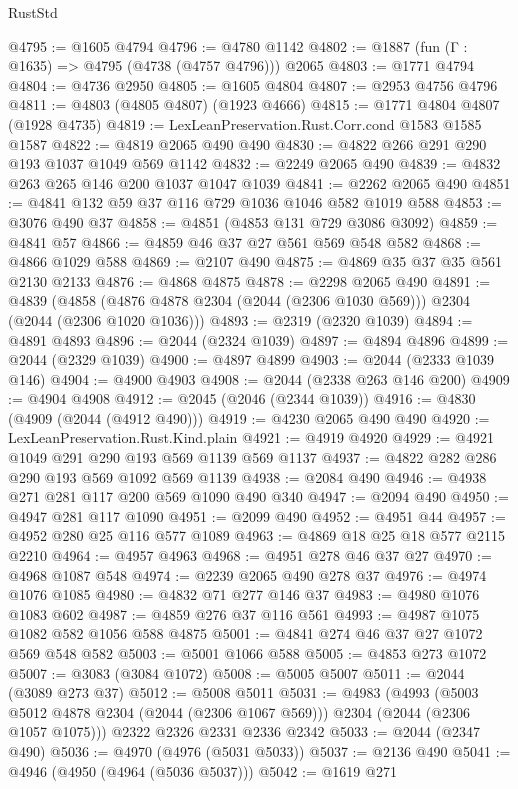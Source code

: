 \begin{lexlean}{RustStd}
\begin{coremodule}
@4795 := @1605 @4794
@4796 := @4780 @1142
@4802 := @1887 (fun (Γ : @1635) => @4795 (@4738 (@4757 @4796))) @2065
@4803 := @1771 @4794
@4804 := @4736 @2950
@4805 := @1605 @4804
@4807 := @2953 @4756 @4796
@4811 := @4803 (@4805 @4807) (@1923 @4666)
@4815 := @1771 @4804 @4807 (@1928 @4735)
@4819 := LexLeanPreservation.Rust.Corr.cond @1583 @1585 @1587
@4822 := @4819 @2065 @490 @490
@4830 := @4822 @266 @291 @290 @193 @1037 @1049 @569 @1142
@4832 := @2249 @2065 @490
@4839 := @4832 @263 @265 @146 @200 @1037 @1047 @1039
@4841 := @2262 @2065 @490
@4851 := @4841 @132 @59 @37 @116 @729 @1036 @1046 @582 @1019 @588
@4853 := @3076 @490 @37
@4858 := @4851 (@4853 @131 @729 @3086 @3092)
@4859 := @4841 @57
@4866 := @4859 @46 @37 @27 @561 @569 @548 @582
@4868 := @4866 @1029 @588
@4869 := @2107 @490
@4875 := @4869 @35 @37 @35 @561 @2130 @2133
@4876 := @4868 @4875
@4878 := @2298 @2065 @490
@4891 := @4839
    (@4858 (@4876 @4878 @2304 (@2044 (@2306 @1030 @569))) @2304 (@2044 (@2306 @1020 @1036)))
@4893 := @2319 (@2320 @1039)
@4894 := @4891 @4893
@4896 := @2044 (@2324 @1039)
@4897 := @4894 @4896
@4899 := @2044 (@2329 @1039)
@4900 := @4897 @4899
@4903 := @2044 (@2333 @1039 @146)
@4904 := @4900 @4903
@4908 := @2044 (@2338 @263 @146 @200)
@4909 := @4904 @4908
@4912 := @2045 (@2046 (@2344 @1039))
@4916 := @4830 (@4909 (@2044 (@4912 @490)))
@4919 := @4230 @2065 @490 @490
@4920 := LexLeanPreservation.Rust.Kind.plain
@4921 := @4919 @4920
@4929 := @4921 @1049 @291 @290 @193 @569 @1139 @569 @1137
@4937 := @4822 @282 @286 @290 @193 @569 @1092 @569 @1139
@4938 := @2084 @490
@4946 := @4938 @271 @281 @117 @200 @569 @1090 @490 @340
@4947 := @2094 @490
@4950 := @4947 @281 @117 @1090
@4951 := @2099 @490
@4952 := @4951 @44
@4957 := @4952 @280 @25 @116 @577 @1089
@4963 := @4869 @18 @25 @18 @577 @2115 @2210
@4964 := @4957 @4963
@4968 := @4951 @278 @46 @37 @27
@4970 := @4968 @1087 @548
@4974 := @2239 @2065 @490 @278 @37
@4976 := @4974 @1076 @1085
@4980 := @4832 @71 @277 @146 @37
@4983 := @4980 @1076 @1083 @602
@4987 := @4859 @276 @37 @116 @561
@4993 := @4987 @1075 @1082 @582 @1056 @588 @4875
@5001 := @4841 @274 @46 @37 @27 @1072 @569 @548 @582
@5003 := @5001 @1066 @588
@5005 := @4853 @273 @1072
@5007 := @3083 (@3084 @1072)
@5008 := @5005 @5007
@5011 := @2044 (@3089 @273 @37)
@5012 := @5008 @5011
@5031 := @4983
    (@4993 (@5003 @5012 @4878 @2304 (@2044 (@2306 @1067 @569))) @2304 (@2044 (@2306 @1057 @1075)))
    @2322
    @2326
    @2331
    @2336
    @2342
@5033 := @2044 (@2347 @490)
@5036 := @4970 (@4976 (@5031 @5033))
@5037 := @2136 @490
@5041 := @4946 (@4950 (@4964 (@5036 @5037)))
@5042 := @1619 @271

\end{coremodule}
\end{lexlean}
